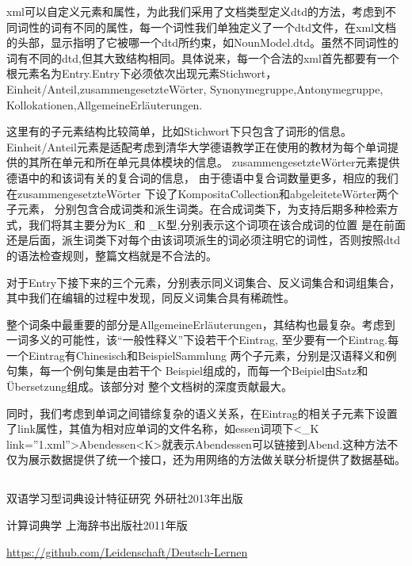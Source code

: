 \documentclass[12pt,twocolumn]{article}
\begin{document}
	xml可以自定义元素和属性，为此我们采用了文档类型定义dtd的方法，考虑到不同词性的词有不同的属性，每一个词性我们单独定义了一个dtd文件，在xml文档的头部，显示指明了它被哪一个dtd所约束，如NounModel.dtd。虽然不同词性的词有不同的dtd,但其大致结构相同。具体说来，每一个合法的xml首先都要有一个根元素名为Entry.Entry下必须依次出现元素Stichwort，Einheit/Anteil,zusammengesetzteWörter,
Synonymegruppe,Antonymegruppe,
Kollokationen,AllgemeineErläuterungen.

这里有的子元素结构比较简单，比如Stichwort下只包含了词形的信息。
Einheit/Anteil元素是适配考虑到清华大学德语教学正在使用的教材为每个单词提供的其所在单元和所在单元具体模块的信息。
zusammengesetzteWörter元素提供德语中的和该词有关的复合词的信息，
由于德语中复合词数量更多，相应的我们在zusammengesetzteWörter
下设了KompositaCollection和abgeleiteteWörter两个子元素，
分别包含合成词类和派生词类。在合成词类下，为支持后期多种检索方式，我们将其主要分为K\_和 \_K型,分别表示这个词项在该合成词的位置
是在前面还是后面，派生词类下对每个由该词项派生的词必须注明它的词性，否则按照dtd的语法检查规则，整篇文档就是不合法的。

对于Entry下接下来的三个元素，分别表示同义词集合、反义词集合和词组集合，其中我们在编辑的过程中发现，同反义词集合具有稀疏性。

整个词条中最重要的部分是AllgemeineErläuterungen，其结构也最复杂。考虑到一词多义的可能性，该“一般性释义”下设若干个Eintrag,
至少要有一个Eintrag.每一个Eintrag有Chinesisch和BeispielSammlung
两个子元素，分别是汉语释义和例句集，每一个例句集是由若干个
Beispiel组成的，而每一个Beipiel由Satz和Übersetzung组成。该部分对
整个文档树的深度贡献最大。

同时，我们考虑到单词之间错综复杂的语义关系，在Eintrag的相关子元素下设置了link属性，其值为相对应单词的文件名称，如essen词项下<\_K link=''1.xml''>Abendessen<\/K>就表示Abendessen可以链接到Abend.这种方法不仅为展示数据提供了统一个接口，还为用网络的方法做关联分析提供了数据基础。
\subsection{\textbf{}}
\subsection{\textbf{}}

\begin{thebibliography}{}
双语学习型词典设计特征研究 外研社2013年出版

 计算词典学 上海辞书出版社2011年版

 \url{https://github.com/Leidenschaft/Deutsch-Lernen}
\end{thebibliography}
\end{document}
